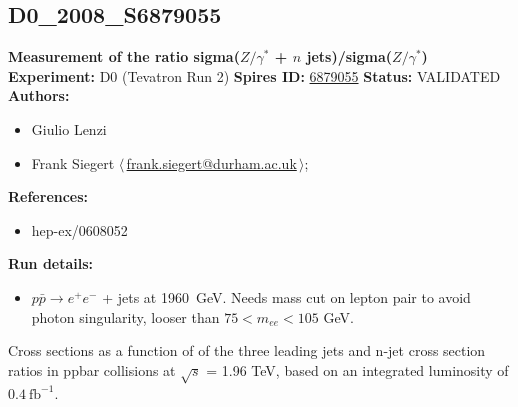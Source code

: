 \subsection[D0\_2008\_S6879055]{D0\_2008\_S6879055\,\cite{Abazov:2006gs}}
\textbf{Measurement of the ratio sigma($Z/\gamma^*$ + $n$ jets)/sigma($Z/\gamma^*$)}\newline
\textbf{Experiment:} D0 (Tevatron Run 2) \newline
\textbf{Spires ID:} \href{http://www.slac.stanford.edu/spires/find/hep/www?rawcmd=key+6879055}{6879055}\newline
\textbf{Status:} VALIDATED\newline
\textbf{Authors:}
\begin{itemize}
  \item Giulio Lenzi
  \item Frank Siegert $\langle\,$\href{mailto:frank.siegert@durham.ac.uk}{frank.siegert@durham.ac.uk}$\,\rangle$;
\end{itemize}
\textbf{References:}
\begin{itemize}
  \item hep-ex/0608052
\end{itemize}
\textbf{Run details:}
\begin{itemize}

  \item $p \bar{p} \to e^+ e^-$ + jets at 1960~GeV. Needs mass cut on lepton pair to avoid photon singularity, looser than $75 < m_{ee} < 105$ GeV.\end{itemize}

\noindent Cross sections as a function of \pT of the three leading jets and n-jet cross section ratios in ppbar collisions at $\sqrt{s}$ = 1.96 TeV, based on an integrated luminosity of $0.4~\text{fb}^{-1}$.

\clearpage


\clearpage

